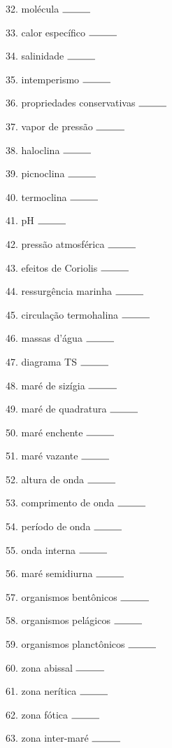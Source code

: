 \documentclass[a4paper,10pt]{article}
\begin{document}
\begin{multicols}{2}
32. molécula $\rule{1cm}{0.15mm}$

33. calor específico $\rule{1cm}{0.15mm}$

34. salinidade $\rule{1cm}{0.15mm}$

35. intemperismo $\rule{1cm}{0.15mm}$

36. propriedades conservativas $\rule{1cm}{0.15mm}$

37. vapor de pressão $\rule{1cm}{0.15mm}$

38. haloclina $\rule{1cm}{0.15mm}$

39. picnoclina $\rule{1cm}{0.15mm}$

40. termoclina $\rule{1cm}{0.15mm}$

41. pH $\rule{1cm}{0.15mm}$

42. pressão atmosférica $\rule{1cm}{0.15mm}$

43. efeitos de Coriolis $\rule{1cm}{0.15mm}$

44. ressurgência marinha $\rule{1cm}{0.15mm}$

45. circulação termohalina $\rule{1cm}{0.15mm}$

46. massas d'água $\rule{1cm}{0.15mm}$

47. diagrama TS $\rule{1cm}{0.15mm}$

48. maré de sizígia $\rule{1cm}{0.15mm}$

49. maré de quadratura $\rule{1cm}{0.15mm}$

50. maré enchente $\rule{1cm}{0.15mm}$

51. maré vazante $\rule{1cm}{0.15mm}$

52. altura de onda $\rule{1cm}{0.15mm}$

53. comprimento de onda $\rule{1cm}{0.15mm}$

54. período de onda $\rule{1cm}{0.15mm}$

55. onda interna $\rule{1cm}{0.15mm}$

56. maré semidiurna $\rule{1cm}{0.15mm}$

57. organismos bentônicos $\rule{1cm}{0.15mm}$

58. organismos pelágicos $\rule{1cm}{0.15mm}$

59. organismos planctônicos $\rule{1cm}{0.15mm}$

60. zona abissal $\rule{1cm}{0.15mm}$

61. zona nerítica $\rule{1cm}{0.15mm}$

62. zona fótica $\rule{1cm}{0.15mm}$

63. zona inter-maré $\rule{1cm}{0.15mm}$


\end{multicols}
\end{document}

